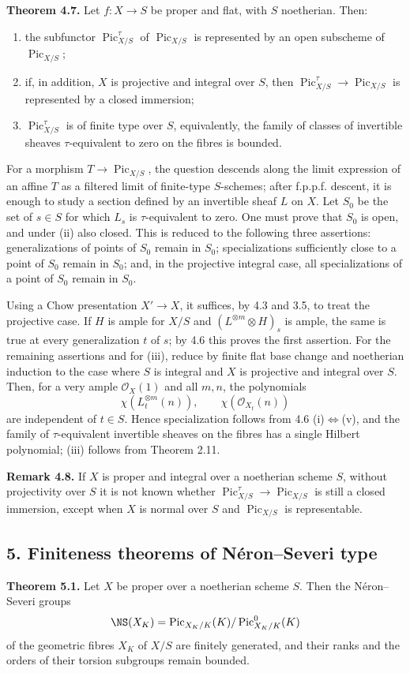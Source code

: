 \documentclass[11pt]{article}
\providecommand{\Pic}{\operatorname{Pic}}
\begin{document}
\textbf{Theorem 4.7.} Let $f:X\to S$ be proper and flat, with $S$ noetherian. Then:
\begin{enumerate}[label=\roman*)]
\item the subfunctor $\Pic^\tau_{X/S}$ of $\Pic_{X/S}$ is represented by an open subscheme of $\Pic_{X/S}$;
\item if, in addition, $X$ is projective and integral over $S$, then $\Pic^\tau_{X/S}\to\Pic_{X/S}$ is represented by a closed immersion;
\item $\Pic^\tau_{X/S}$ is of finite type over $S$, equivalently, the family of classes of invertible sheaves $\tau$-equivalent to zero on the fibres is bounded.
\end{enumerate}
For a morphism $T\to\Pic_{X/S}$, the question descends along the limit expression of an affine $T$ as a filtered limit of finite-type $S$-schemes; after f.p.p.f. descent, it is enough to study a section defined by an invertible sheaf $L$ on $X$. Let $S_0$ be the set of $s\in S$ for which $L_s$ is $\tau$-equivalent to zero. One must prove that $S_0$ is open, and under (ii) also closed. This is reduced to the following three assertions: generalizations of points of $S_0$ remain in $S_0$; specializations sufficiently close to a point of $S_0$ remain in $S_0$; and, in the projective integral case, all specializations of a point of $S_0$ remain in $S_0$.

Using a Chow presentation $X'\to X$, it suffices, by 4.3 and 3.5, to treat the projective case. If $H$ is ample for $X/S$ and $(L^{\otimes m}\otimes H)_s$ is ample, the same is true at every generalization $t$ of $s$; by 4.6 this proves the first assertion. For the remaining assertions and for (iii), reduce by finite flat base change and noetherian induction to the case where $S$ is integral and $X$ is projective and integral over $S$. Then, for a very ample $\mathcal O_X(1)$ and all $m,n$, the polynomials
\[
 \chi(L_t^{\otimes m}(n)),\qquad \chi(\mathcal O_{X_t}(n))
\]
are independent of $t\in S$. Hence specialization follows from 4.6 (i)$\Leftrightarrow$(v), and the family of $\tau$-equivalent invertible sheaves on the fibres has a single Hilbert polynomial; (iii) follows from Theorem 2.11.

\textbf{Remark 4.8.} If $X$ is proper and integral over a noetherian scheme $S$, without projectivity over $S$ it is not known whether $\Pic^\tau_{X/S}\to\Pic_{X/S}$ is still a closed immersion, except when $X$ is normal over $S$ and $\Pic_{X/S}$ is representable.

\subsection*{5. Finiteness theorems of N\'eron--Severi type}
\textbf{Theorem 5.1.} Let $X$ be proper over a noetherian scheme $S$. Then the N\'eron--Severi groups
\[
 \NS(X_K)=\Pic_{X_K/K}(K)/\Pic^0_{X_K/K}(K)
\]
of the geometric fibres $X_K$ of $X/S$ are finitely generated, and their ranks and the orders of their torsion subgroups remain bounded.
\end{document}
